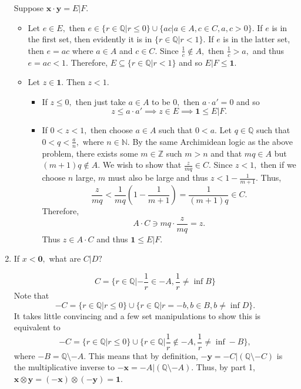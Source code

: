 \documentclass[11pt]{article}
\newcommand{\bbN}{\mathbb{N}}
\newcommand{\bbQ}{\mathbb{Q}}
\newcommand{\bbZ}{\mathbb{Z}}
\newcommand{\sm}{\setminus}
\begin{document}
\begin{enumerate}
\begin{solution}
        
        Suppose $\textbf{x} \cdot \textbf{y}  = E | F.$
        \begin{itemize}
            \item Let $e \in E,$ then $e \in \{r \in \bbQ | r\leq 0\}\cup \{ac | a\in A, c\in C, a,c>0\}.$ If $e$ is in the first set, then evidently it is in $\{r\in \bbQ | r< 1\}.$ If $e$ is in the latter set, then $e = ac$ where $a\in A$ and $c\in C.$ Since $\frac{1}{c}\notin A,$ then $\frac{1}{c} >a,$ and thus $e=ac<1.$ Therefore, $E\subseteq \{r\in \bbQ | r<1\}$ and so $E | F \leq \textbf{1}.$ 
            \item Let $z\in \textbf{1}.$ Then $z<1.$ 
            \begin{itemize}
                \item If $z\leq 0,$ then just take $a\in A$ to be $0,$ then $a \cdot a' = 0$ and so \[z\leq a \cdot a' \implies z\in E \implies \textbf{1}\leq E | F.\]
                \item If $0<z<1,$ then choose $a\in A$ such that $0<a.$ Let $q\in \bbQ$ such that $0< q < \frac{a}{n},$ where $n\in \bbN.$ By the same Archimidean logic as the above problem, there exists some $m\in \bbZ$ such $m> n$ and that $mq \in A$ but $(m+1)q \notin A.$ We wish to show that $\frac{z}{mq}\in C.$ Since $z<1,$ then if we choose $n$ large, $m$ must also be large and thus $z< 1 - \frac{1}{m+1}.$ Thus,
                \[\frac{z}{mq}< \frac{1}{mq}(1-\frac{1}{m+1}) = \frac{1}{(m+1)q}\in C.\] Therefore, 
                \[A \cdot C \ni mq \cdot \frac{z}{mq} = z.\] Thus $z\in A \cdot C$ and thus $\textbf{1}\leq E | F.$
            \end{itemize}
        \end{itemize}
    \end{solution}
    \item 
    \begin{problem}
        If $x< \textbf{0},$ what are $C | D?$
    \end{problem}
    \begin{solution}
        \[C = \{r \in \bbQ | -\frac{1}{r}\in -A, \frac{1}{r} \neq \inf B\}\]
        Note that \[-C = \{r\in \bbQ | r\leq 0\}\cup \{r\in \bbQ | r= -b, b\in B, b\neq \inf D\}.\] It takes little convincing and a few set manipulations to show this is equivalent to \[-C = \{r\in \bbQ | r\leq 0\}\cup \{r\in \bbQ | \frac{1}{r}\notin -A, \frac{1}{r}\neq \inf -B\},\] where $-B = \bbQ \sm -A.$ This means that by definition, $-\textbf{y} = -C |( \bbQ \sm -C)$ is the multiplicative inverse to $-\textbf{x} = -A | (\bbQ \sm -A).$ Thus, by part 1, $\textbf{x}\otimes \textbf{y} = (-\textbf{x}) \otimes (-\textbf{y}) = \textbf{1}$.

\end{solution}
\end{enumerate}
\end{document}
